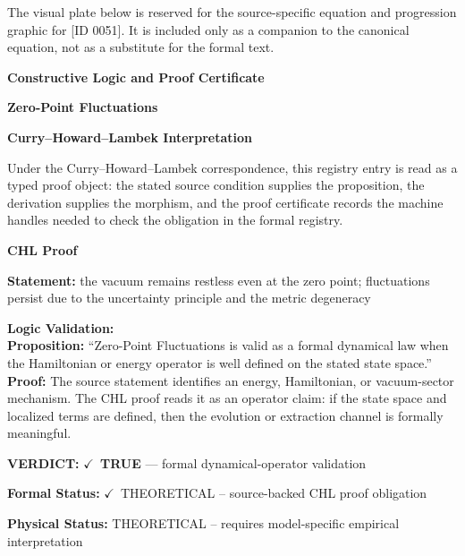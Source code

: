 \begingroup\footnotesize\sloppy
The visual plate below is reserved for the source-specific equation and progression graphic for [ID 0051]. It is included only as a companion to the canonical equation, not as a substitute for the formal text.
\par\endgroup
\ifTZPDarkEdition
{}
\fi

\clearpage
\begingroup\tzpsupportsetup
\noindent\textbf{\fontsize{10.8pt}{12.8pt}\selectfont [ID 0051] Constructive Logic and Proof Certificate}\par
\noindent\textbf{\fontsize{10pt}{12pt}\selectfont Zero-Point Fluctuations}\par
\vspace{0.45em}
\begingroup
\footnotesize
\setlength{\parskip}{0.22em}
\setlength{\parindent}{0pt}
\noindent\textbf{Curry--Howard--Lambek Interpretation}\par
Under the Curry--Howard--Lambek correspondence, this registry entry is read as a typed proof
object: the stated source condition supplies the proposition, the derivation supplies the
morphism, and the proof certificate records the machine handles needed to check the obligation
in the formal registry.

\vspace{0.45em}
\noindent\textbf{CHL Proof}\par
\textbf{Statement:} the vacuum remains restless even at the zero point; fluctuations persist due to the
uncertainty principle and the metric degeneracy

\textbf{Logic Validation:}\\
\textbf{Proposition:} ``Zero-Point Fluctuations is valid as a formal dynamical law when the Hamiltonian or
energy operator is well defined on the stated state space.''\\
\textbf{Proof:} The source statement identifies an energy, Hamiltonian, or vacuum-sector mechanism. The
CHL proof reads it as an operator claim: if the state space and localized terms are
defined, then the evolution or extraction channel is formally meaningful.

\textbf{VERDICT:} \ensuremath{\checkmark}\ \textbf{TRUE} --- formal dynamical-operator validation

\textbf{Formal Status:} \ensuremath{\checkmark}\ THEORETICAL -- source-backed CHL proof obligation

\textbf{Physical Status:} THEORETICAL -- requires model-specific empirical interpretation
\par\vspace{0.45em}
\par
\ifTZPDarkEdition
{}
\fi
\endgroup
\endgroup
